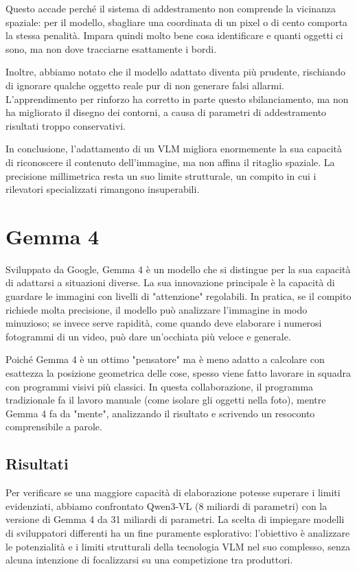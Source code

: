 \noindent
Questo accade perché il sistema di addestramento non comprende la vicinanza spaziale: per il modello, sbagliare una coordinata di un pixel o di cento comporta la stessa penalità. Impara quindi molto bene cosa identificare
e quanti oggetti ci sono, ma non dove tracciarne esattamente i bordi.

\noindent
Inoltre, abbiamo notato che il modello adattato diventa più prudente, rischiando di ignorare qualche oggetto reale pur di non generare falsi allarmi. L'apprendimento per rinforzo ha corretto in parte questo sbilanciamento,
ma non ha migliorato il disegno dei contorni, a causa di parametri di addestramento risultati troppo conservativi.

\noindent
In conclusione, l'adattamento di un VLM migliora enormemente la sua capacità di riconoscere il contenuto dell'immagine, ma non affina il ritaglio spaziale.
La precisione millimetrica resta un suo limite strutturale, un compito in cui i rilevatori specializzati rimangono insuperabili.

\newpage

\section{Gemma 4}

Sviluppato da Google, Gemma 4 è un modello che si distingue per la sua capacità di adattarsi a situazioni diverse. La sua innovazione principale è la capacità di guardare le immagini con livelli di "attenzione" regolabili.
In pratica, se il compito richiede molta precisione, il modello può analizzare l'immagine in modo minuzioso; se invece serve rapidità, come quando deve elaborare i numerosi fotogrammi di un video, può dare un'occhiata più veloce e generale. \cite{google_gemma4}

\noindent
Poiché Gemma 4 è un ottimo "pensatore" ma è meno adatto a calcolare con esattezza la posizione geometrica delle cose, spesso viene fatto lavorare in squadra con programmi visivi più classici.
In questa collaborazione, il programma tradizionale fa il lavoro manuale (come isolare gli oggetti nella foto), mentre Gemma 4 fa da "mente", analizzando il risultato e scrivendo un resoconto comprensibile a parole.

\subsection{Risultati}

Per verificare se una maggiore capacità di elaborazione potesse superare i limiti evidenziati, abbiamo confrontato Qwen3-VL (8 miliardi di parametri) con la versione di Gemma 4 da 31 miliardi di parametri.
La scelta di impiegare modelli di sviluppatori differenti ha un fine puramente esplorativo: l'obiettivo è analizzare le potenzialità e i limiti strutturali della tecnologia VLM nel suo complesso,
senza alcuna intenzione di focalizzarsi su una competizione tra produttori.

